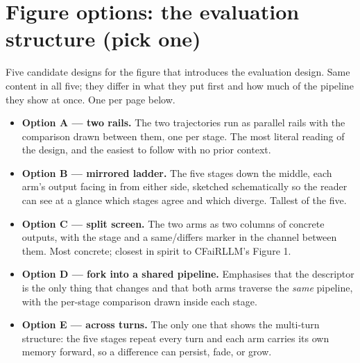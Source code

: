 
\clearpage
\section*{Figure options: the evaluation structure (pick one)}

Five candidate designs for the figure that introduces the evaluation design. Same content in
all five; they differ in what they put first and how much of the pipeline they show at once.
One per page below.

\begin{itemize}
  \item \textbf{Option A --- two rails.} The two trajectories run as parallel rails with the
    comparison drawn between them, one per stage. The most literal reading of the design, and
    the easiest to follow with no prior context.
  \item \textbf{Option B --- mirrored ladder.} The five stages down the middle, each arm's
    output facing in from either side, sketched schematically so the reader can see at a glance
    which stages agree and which diverge. Tallest of the five.
  \item \textbf{Option C --- split screen.} The two arms as two columns of concrete outputs,
    with the stage and a same/differs marker in the channel between them. Most concrete;
    closest in spirit to CFaiRLLM's Figure 1.
  \item \textbf{Option D --- fork into a shared pipeline.} Emphasises that the descriptor is
    the only thing that changes and that both arms traverse the \emph{same} pipeline, with the
    per-stage comparison drawn inside each stage.
  \item \textbf{Option E --- across turns.} The only one that shows the multi-turn structure:
    the five stages repeat every turn and each arm carries its own memory forward, so a
    difference can persist, fade, or grow.
\end{itemize}


